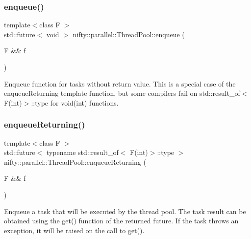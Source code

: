 \subsubsection{\texorpdfstring{enqueue()}{enqueue()}}
{\footnotesize\ttfamily template$<$class F $>$ \\
std\+::future$<$ void $>$ nifty\+::parallel\+::\+Thread\+Pool\+::enqueue (\begin{DoxyParamCaption}\item[{F \&\&}]{f }\end{DoxyParamCaption})\hspace{0.3cm}{\ttfamily [inline]}}

Enqueue function for tasks without return value. This is a special case of the enqueue\+Returning template function, but some compilers fail on {\ttfamily std\+::result\+\_\+of$<$\+F(int)$>$\+::type} for void(int) functions. \mbox{\label{group__ParallelProcessing_ga5ffeb64ca8f60c37ad2db97bf80b05af}} 
\subsubsection{\texorpdfstring{enqueue\+Returning()}{enqueueReturning()}}
{\footnotesize\ttfamily template$<$class F $>$ \\
std\+::future$<$ typename std\+::result\+\_\+of$<$ F(int)$>$\+::type $>$ nifty\+::parallel\+::\+Thread\+Pool\+::enqueue\+Returning (\begin{DoxyParamCaption}\item[{F \&\&}]{f }\end{DoxyParamCaption})\hspace{0.3cm}{\ttfamily [inline]}}

Enqueue a task that will be executed by the thread pool. The task result can be obtained using the get() function of the returned future. If the task throws an exception, it will be raised on the call to get(). \mbox{\label{group__ParallelProcessing_ga505ac3d12ecde87341bce7b6f1027c88}} 
